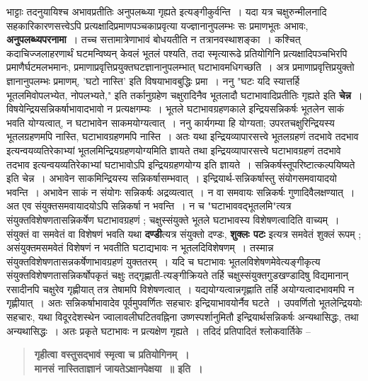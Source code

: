 {भाट्टाः तदनुयायिश्च अभावप्रतीतिः अनुपलब्ध्या गृह्यते इत्यङ्गीकुर्वन्ति~। यदा यत्र \break चक्षुरुन्मीलनादि सहकारिकारणसत्त्वेऽपि प्रत्यक्षादिप्रमाणपञ्चकाप्रवृत्या यज्ज्ञानानुपलम्भः \-सः प्रमाणभूतः अभावः, \textbf{अनुपलब्ध्यपरनामा}~। तच्च सत्तामात्रेणाभावं बोधयतीति न तत्रानवस्थाशङ्का~। कश्चित् कदाचिज्जलाहरणार्थं घटमन्विष्यन् केवलं भूतलं पश्यति, तदा स्मृत्या\-रूढे प्रतियोगिनि प्रत्यक्षादिपञ्चभिरपि प्रमाणैर्घटमलभमानः, प्रमाणाप्रवृत्तिप्रयुक्तघटज्ञानानुपलम्भात् घटाभावमधिगच्छति~। अत्र प्रमाणाप्रवृत्तिप्रयुक्तो ज्ञानानुपलम्भः प्रमाणम्, 'घटो \break नास्ति' इति विषयाभावबुद्धिः प्रमा~। ननु "घटः यदि स्यात्तर्हि भूतलमिवोपलभ्येत, नोप\-लभ्यते," इति तर्कानुग्रहेण चक्षुरादिनैव भूतलादौ घटाभावादिप्रतीतिः गृह्यते इति \textbf{चेन्न}~। \break विषयेन्द्रियसन्निकर्षाभावादभावो न प्रत्यक्षगम्यः~। भूतले घटाभावग्रहणकाले इन्द्रियसन्नि\-कर्षः भूतलेन साकं भवति योग्यत्वात्, न घटाभावेन साकमयोग्यत्वात्~। ननु कार्यगम्या हि योग्यता; उपरतचक्षुरिन्द्रियस्य भूतलग्रहणमपि नास्ति, घटाभावग्रहणमपि नास्ति~। अतः यथा इन्द्रियव्यापारसत्त्वे भूतलग्रहणं तदभावे तदभाव इत्यन्वयव्यतिरेकाभ्यां भूतलमिन्द्रियग्रहणयोग्यमिति ज्ञायते तथा इन्द्रियव्यापारसत्त्वे घटाभावग्रहणं तदभावे तदभाव इत्यन्वयव्यतिरेकाभ्यां घटाभावोऽपि इन्द्रियग्रहणयोग्य इति ज्ञायते~। सन्निकर्षस्तूपरिष्टात्कल्पयिष्यते इति चेन्न~। अभावेन साकमिन्द्रियस्य सन्निकर्षासम्भवात्~। इन्द्रियार्थ-सन्निकर्षास्तु संयोगसमवायादयो भवन्ति~। अभावेन साकं न संयोगः सन्निकर्षः अद्रव्यत्वात्~। न वा समवायः सन्निकर्षः गुणादिवैलक्षण्यात्~। अत एव संयुक्तसमवायादयोऽपि सन्निकर्षा न भवन्ति~। न च "घटाभाववद्भूतलमि"त्यत्र संयुक्तविशेषणतासन्निकर्षेण घटाभावग्रहणं ; चक्षुस्संयुक्ते भूतले घटाभावस्य विशेषणत्वादिति वाच्यम्~। संयुक्तं वा समवेतं वा विशेषणं भवति यथा \textbf{दण्डी}त्यत्र संयुक्तो दण्डः, \textbf{शुक्लः पटः} इत्यत्र समवेतं शुक्लं रूपम् ; असंयुक्तमसमवेतं विशेषणं न भवतीति घटाद्यभावः न भूतलदिविशेषणम्~। तस्मान्न संयुक्तविशेषणतासन्नकर्षेणाभावग्रहणं युक्ततरम्~। यदि च घटाभावः भूतलविशेषणमेवेत्यङ्गीकृत्य संयुक्तविशेषणतासन्निकर्षोपकृतं चक्षुः तद्गृह्णाती-त्यङ्गीक्रियते तर्हि चक्षुस्संयुक्तगुडखण्डादिषु विद्यमानान् रसादीनपि चक्षुरेव गृह्णीयात् तत्र तेषा\-मपि विशेषणत्वात्~। यद्ययोग्यत्वान्नगृह्णाति तर्हि अयोग्यत्वादभावमपि न गृह्णीयात्~। अतः सन्निकर्षाभावादेव पूर्वमुपवर्णितः सहचारः इन्द्रियाभावयोर्नैव घटते~। उप\-वर्णितो भूतलेन्द्रिययोः सहचारः, यथा विदूरदेशस्थेन ज्वालावलीघटितवह्निना उष्णस्पर्शानुमितौ इन्द्रियार्थ\-सन्निकर्षः अन्यथासिद्धः, तथा अन्यथासिद्धः~। अतः प्रकृते घटाभावः न प्रत्यक्षेण गृह्यते~। तदिदं प्रतिपादितं श्लोकवार्तिके –
\begin{verse}
\textbf{गृहीत्वा वस्तुसद्भावं स्मृत्वा च प्रतियोगिनम्~। }\\
\textbf{मानसं नास्तिताज्ञानं जायतेऽक्षानपेक्षया~॥  इति~। }

\end{verse}}
